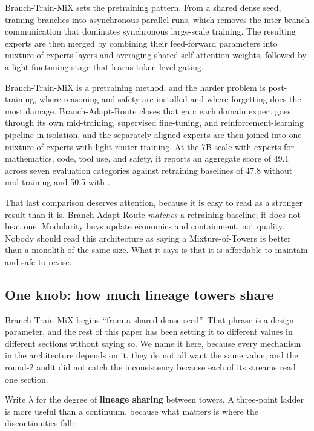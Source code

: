 \documentclass[11pt]{article}
\begin{document}
Branch-Train-MiX \cite{sukhbaatar2024btx} sets the pretraining pattern. From a shared dense seed, training branches into asynchronous parallel runs, which removes the inter-branch communication that dominates synchronous large-scale training. The resulting experts are then merged by combining their feed-forward parameters into mixture-of-experts layers and averaging shared self-attention weights, followed by a light finetuning stage that learns token-level gating.

Branch-Train-MiX is a pretraining method, and the harder problem is post-training, where reasoning and safety are installed and where forgetting does the most damage. Branch-Adapt-Route \cite{morrison2026bar} closes that gap: each domain expert goes through its own mid-training, supervised fine-tuning, and reinforcement-learning pipeline in isolation, and the separately aligned experts are then joined into one mixture-of-experts with light router training. At the 7B scale with experts for mathematics, code, tool use, and safety, it reports an aggregate score of 49.1 across seven evaluation categories against retraining baselines of 47.8 without mid-training and 50.5 with \cite{morrison2026bar}.

That last comparison deserves attention, because it is easy to read as a stronger result than it is. Branch-Adapt-Route \emph{matches} a retraining baseline; it does not beat one. Modularity buys update economics and containment, not quality. Nobody should read this architecture as saying a Mixture-of-Towers is better than a monolith of the same size. What it says is that it is affordable to maintain and safe to revise.

\subsection{One knob: how much lineage towers share}
\label{sec:lineage}

Branch-Train-MiX begins ``from a shared dense seed''. That phrase is a design parameter, and the rest of this paper has been setting it to different values in different sections without saying so. We name it here, because every mechanism in the architecture depends on it, they do not all want the same value, and the round-2 audit did not catch the inconsistency because each of its streams read one section.

Write $\lambda$ for the degree of \textbf{lineage sharing} between towers. A three-point ladder is more useful than a continuum, because what matters is where the discontinuities fall:
\end{document}

